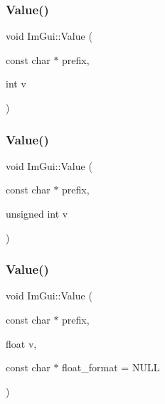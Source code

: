 \mbox{\label{namespace_im_gui_a654ceb70f2dd1598f88861f54764ee08}} 
\subsubsection{\texorpdfstring{Value()}{Value()}\hspace{0.1cm}{\footnotesize\ttfamily [2/4]}}
{\footnotesize\ttfamily void Im\+Gui\+::\+Value (\begin{DoxyParamCaption}\item[{const char $\ast$}]{prefix,  }\item[{int}]{v }\end{DoxyParamCaption})}

\mbox{\label{namespace_im_gui_aec80a3e35bf7c1ff5704334e5a3ebd5a}} 
\subsubsection{\texorpdfstring{Value()}{Value()}\hspace{0.1cm}{\footnotesize\ttfamily [3/4]}}
{\footnotesize\ttfamily void Im\+Gui\+::\+Value (\begin{DoxyParamCaption}\item[{const char $\ast$}]{prefix,  }\item[{unsigned int}]{v }\end{DoxyParamCaption})}

\mbox{\label{namespace_im_gui_a0c8b87438082a1d0a46ae2a76090ca16}} 
\subsubsection{\texorpdfstring{Value()}{Value()}\hspace{0.1cm}{\footnotesize\ttfamily [4/4]}}
{\footnotesize\ttfamily void Im\+Gui\+::\+Value (\begin{DoxyParamCaption}\item[{const char $\ast$}]{prefix,  }\item[{float}]{v,  }\item[{const char $\ast$}]{float\+\_\+format = {\ttfamily NULL} }\end{DoxyParamCaption})}

